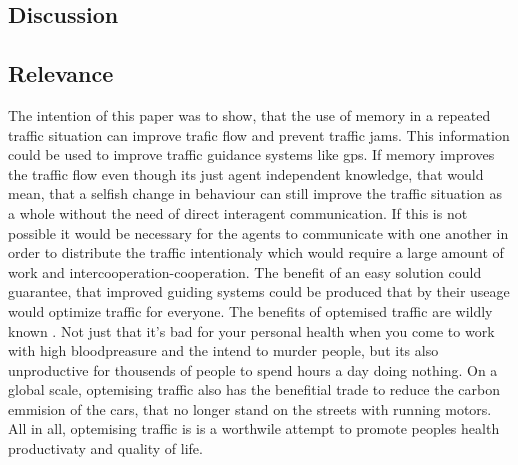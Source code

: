 \documentclass[a4paper,hidelinks]{article}
\begin{document}
\subsection{Discussion}
\subsection{Relevance}
The intention of this paper was to show, that the use of memory in a repeated traffic situation can improve trafic flow and prevent traffic jams. This information could be used to improve traffic guidance systems like gps. If memory improves the traffic flow even though its just agent independent knowledge, that would mean, that a selfish change in behaviour can still improve the traffic situation as a whole without the need of direct interagent communication. If this is not possible it would be necessary for the agents to communicate with one another in order to distribute the traffic intentionaly which would require a large amount of work and intercooperation-cooperation. 
The benefit of an easy solution could guarantee, that improved guiding systems could be produced that by their useage would optimize traffic for everyone. 
The benefits of optemised traffic are wildly known \cite{france2003multiagent}. Not just that it's bad for your personal health when you come to work with high bloodpreasure and the intend to murder people, but its also unproductive for thousends of people to spend hours a day doing nothing. On a global scale, optemising traffic also has the benefitial trade to reduce the carbon emmision of the cars, that no longer stand on the streets with running motors. 
All in all, optemising traffic is is a worthwile attempt to promote peoples health productivaty and quality of life. 



\end{document}
